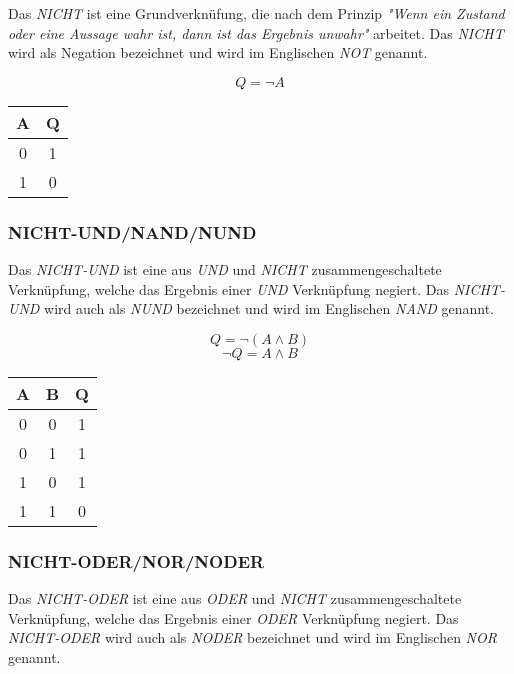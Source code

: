 \documentclass[a4paper, 12pt]{report}
\begin{document}
Das \emph{NICHT} ist eine Grundverknüfung, die nach dem Prinzip \emph{"Wenn ein
Zustand oder eine Aussage wahr ist, dann ist das Ergebnis unwahr"} arbeitet.
Das \emph{NICHT} wird als Negation bezeichnet und wird im Englischen \emph{NOT}
genannt.

\begin{center}
    \begin{equation}
	Q = \neg A
    \end{equation}
	\begin{tabular}{ | c || c | }
		\hline
		A & Q \\ \hline
		0 & 1 \\ \hline
		1 & 0 \\
		\hline
	\end{tabular}
\end{center}

\subsubsection{NICHT-UND/NAND/NUND}

Das \emph{NICHT-UND} ist eine aus \emph{UND} und \emph{NICHT}
zusammengeschaltete Verknüpfung, welche das Ergebnis einer \emph{UND}
Verknüpfung negiert. Das \emph{NICHT-UND} wird auch als \emph{NUND}
bezeichnet und wird im Englischen \emph{NAND} genannt.

\begin{center}
    \begin{equation}
	Q = \neg(A \land B)
    \end{equation}
    \begin{equation}
	\neg Q = A \land B
    \end{equation}
   \begin{tabular}{ | c | c || c | }
    	\hline
    	A & B & Q \\ \hline
    	0 & 0 & 1 \\ \hline
    	0 & 1 & 1 \\ \hline
    	1 & 0 & 1 \\ \hline
    	1 & 1 & 0 \\
    	\hline
    \end{tabular}
\end{center}

\subsubsection{NICHT-ODER/NOR/NODER}

Das \emph{NICHT-ODER} ist eine aus \emph{ODER} und \emph{NICHT}
zusammengeschaltete Verknüpfung, welche das Ergebnis einer \emph{ODER}
Verknüpfung negiert. Das \emph{NICHT-ODER} wird auch als \emph{NODER}
bezeichnet und wird im Englischen \emph{NOR} genannt.
\end{document}
